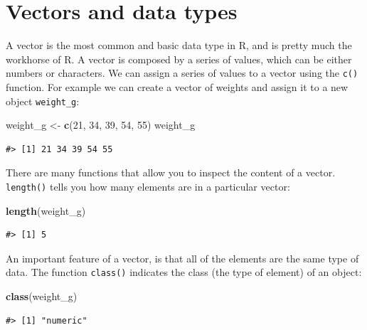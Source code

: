 \documentclass[
]{book}
\newenvironment{Shaded}{\begin{snugshade}}{\end{snugshade}}
\newcommand{\DecValTok}[1]{\textcolor[rgb]{0.00,0.00,0.81}{#1}}
\newcommand{\KeywordTok}[1]{\textcolor[rgb]{0.13,0.29,0.53}{\textbf{#1}}}
\newcommand{\NormalTok}[1]{#1}
\newcommand{\StringTok}[1]{\textcolor[rgb]{0.31,0.60,0.02}{#1}}
\begin{document}
\hypertarget{vectors-and-data-types}{%
\section{Vectors and data types}\label{vectors-and-data-types}}

A vector is the most common and basic data type in R, and is pretty much
the workhorse of R. A vector is composed by a series of values, which can be
either numbers or characters. We can assign a series of values to a vector using
the \texttt{c()} function. For example we can create a vector of weights and assign
it to a new object \texttt{weight\_g}:

\begin{Shaded}
\begin{Highlighting}[]
\NormalTok{weight_g <-}\StringTok{ }\KeywordTok{c}\NormalTok{(}\DecValTok{21}\NormalTok{, }\DecValTok{34}\NormalTok{, }\DecValTok{39}\NormalTok{, }\DecValTok{54}\NormalTok{, }\DecValTok{55}\NormalTok{)}
\NormalTok{weight_g}
\end{Highlighting}
\end{Shaded}

\begin{verbatim}
#> [1] 21 34 39 54 55
\end{verbatim}

There are many functions that allow you to inspect the content of a
vector. \texttt{length()} tells you how many elements are in a particular vector:

\begin{Shaded}
\begin{Highlighting}[]
\KeywordTok{length}\NormalTok{(weight_g)}
\end{Highlighting}
\end{Shaded}

\begin{verbatim}
#> [1] 5
\end{verbatim}

An important feature of a vector, is that all of the elements are the same type of data.
The function \texttt{class()} indicates the class (the type of element) of an object:

\begin{Shaded}
\begin{Highlighting}[]
\KeywordTok{class}\NormalTok{(weight_g)}
\end{Highlighting}
\end{Shaded}

\begin{verbatim}
#> [1] "numeric"
\end{verbatim}
\end{document}
